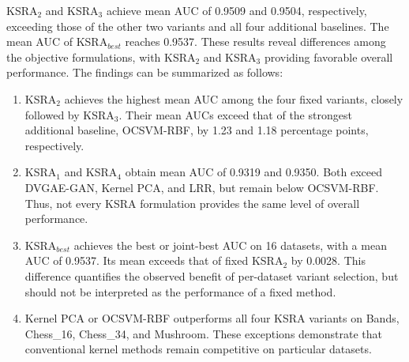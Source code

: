 \documentclass[ASNA,twocolumn]{USG} %
\begin{document}
KSRA$_2$ and KSRA$_3$ achieve mean AUC of 0.9509 and
0.9504, respectively, exceeding those of the other two variants and all four additional baselines. The mean AUC of KSRA$_{best}$ reaches 0.9537. These results reveal differences among the objective formulations, with KSRA$_2$ and KSRA$_3$ providing favorable overall performance. The findings can be summarized as follows:

\begin{enumerate}[\indent (1)]
    \item KSRA$_2$ achieves the highest mean AUC among the
    four fixed variants, closely followed by KSRA$_3$.
    Their mean AUCs exceed that of the strongest additional baseline, OCSVM-RBF, by 1.23 and 1.18 percentage points, respectively.

    \item KSRA$_1$ and KSRA$_4$ obtain mean AUC of
    0.9319 and 0.9350. Both exceed DVGAE-GAN,
    Kernel PCA, and LRR, but remain below OCSVM-RBF.
    Thus, not every KSRA formulation provides the same
    level of overall performance.

    \item KSRA$_{best}$ achieves the best or joint-best AUC
    on 16 datasets, with a mean AUC of 0.9537.
    Its mean exceeds that of fixed KSRA$_2$ by 0.0028.
    This difference quantifies the observed benefit of
    per-dataset variant selection, but should not be
    interpreted as the performance of a fixed method.

    \item Kernel PCA or OCSVM-RBF outperforms all four
    KSRA variants on Bands, Chess\_16, Chess\_34,
    and Mushroom. These exceptions demonstrate that
    conventional kernel methods remain competitive
    on particular datasets.
\end{enumerate}
\end{document}
